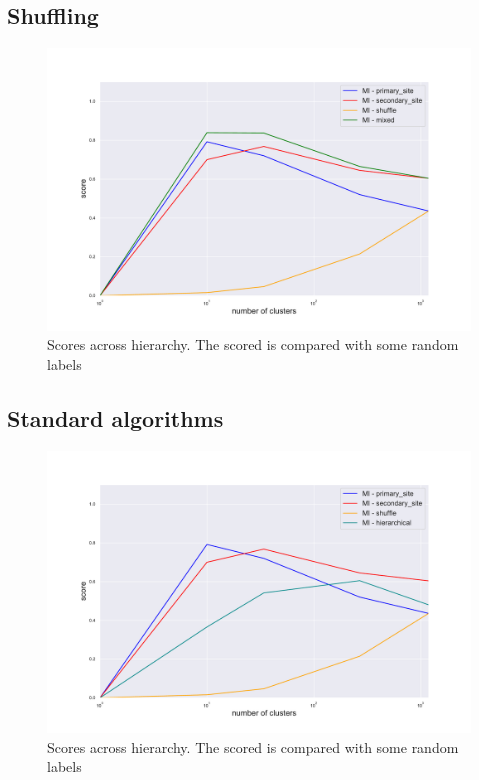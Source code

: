 \subsection{Shuffling}

\begin{figure}[htb!]
    \centering
    \includegraphics[width=0.9\linewidth]{pictures/topic/gtex/oversigma_10tissue/metric_scores_shuffle.pdf}
    \caption{Scores across hierarchy. The scored is compared with some random labels}
    \label{fig:topic/gtex/oversigma_10tissue/metric_scores_shuffle}
\end{figure}

\subsection{Standard algorithms}

\begin{figure}[htb!]
    \centering
    \includegraphics[width=0.9\linewidth]{pictures/topic/gtex/oversigma_10tissue/metric_scores_hier.pdf}
    \caption{Scores across hierarchy. The scored is compared with some random labels}
    \label{fig:topic/gtex/oversigma_10tissue/metric_scores_hier}
\end{figure}

